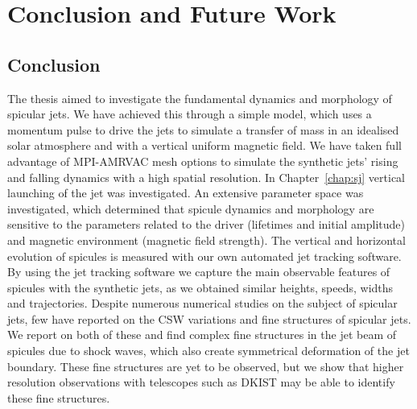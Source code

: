 \chapter{Conclusion and Future Work}
\label{chap:con_and_fut_work}
\section{Conclusion}
\label{sec:con}
The thesis aimed to investigate the fundamental dynamics and morphology of spicular jets. We have achieved this through a simple model, which uses a momentum pulse to drive the jets to simulate a transfer of mass in an idealised solar atmosphere and with a vertical uniform magnetic field. We have taken full advantage of MPI-AMRVAC mesh options to simulate the synthetic jets' rising and falling dynamics with a high spatial resolution. \np
%
In Chapter~\ref{chap:sj} vertical launching of the jet was investigated. An extensive parameter space was investigated, which determined that spicule dynamics and morphology are sensitive to the parameters related to the driver (lifetimes and initial amplitude) and magnetic environment (magnetic field strength). The vertical and horizontal evolution of spicules is measured with our own automated jet tracking software. By using the jet tracking software we capture the main observable features of spicules with the synthetic jets, as we obtained similar heights, speeds, widths and trajectories. Despite numerous numerical studies on the subject of spicular jets, few have reported on the CSW variations and fine structures of spicular jets. We report on both of these and find complex fine structures in the jet beam of spicules due to shock waves, which also create symmetrical deformation of the jet boundary. These fine structures are yet to be observed, but we show that higher resolution observations with telescopes such as DKIST may be able to identify these fine structures.  \np
%
